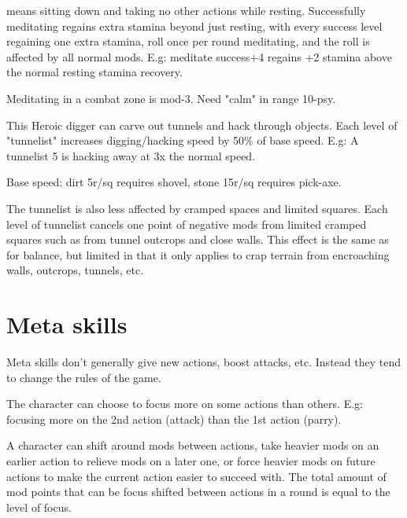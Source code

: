  means sitting down and taking no other actions while resting. Successfully meditating regains extra stamina beyond just resting, with every success level regaining one extra stamina, roll once per round meditating, and the roll is affected by all normal mods. E.g: meditate success+4 regains +2 stamina above the normal resting stamina recovery.

Meditating in a combat zone is mod-3. Need "calm" in range 10-psy.


 This Heroic digger can carve out tunnels and hack through objects. Each level of "tunnelist" increases digging/hacking speed by 50\% of base speed. E.g: A tunnelist 5 is hacking away at 3x the normal speed.

Base speed: dirt 5r/sq requires shovel, stone 15r/sq requires pick-axe.

The tunnelist is also less affected by cramped spaces and limited squares. Each level of tunnelist cancels one point of negative mods from limited cramped squares such as from tunnel outcrops and close walls. This effect is the same as for balance, but limited in that it only applies to crap terrain from encroaching walls, outcrops, tunnels, etc.


\closeskillslist


















\section*{Meta skills}

Meta skills don't generally give new actions, boost attacks, etc. Instead they tend to change the rules of the game.



\openskillslist


 The character can choose to focus more on some actions than others. E.g: focusing more on the 2nd action (attack) than the 1st action (parry).

A character can shift around mods between actions, take heavier mods on an earlier action to relieve mods on a later one, or force heavier mods on future actions to make the current action easier to succeed with. The total amount of mod points that can be focus shifted between actions in a round is equal to the level of focus.

